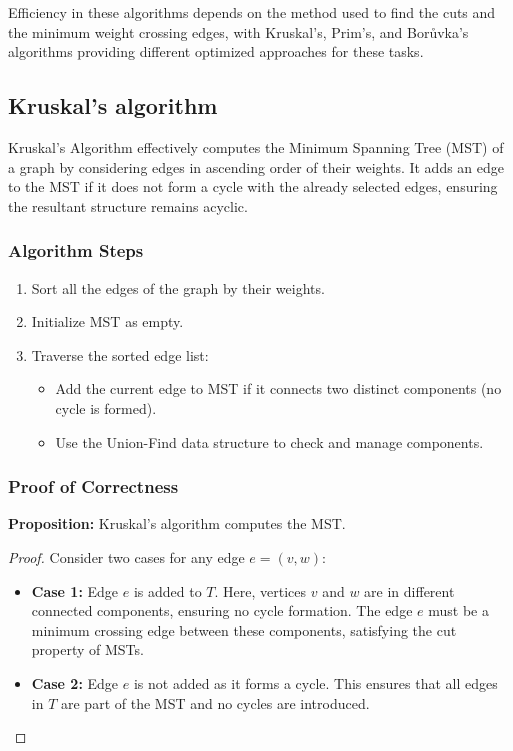 \documentclass{article}
\begin{document}
Efficiency in these algorithms depends on the method used to find the cuts and the minimum weight crossing edges, with Kruskal’s, Prim's, and Borůvka’s algorithms providing different optimized approaches for these tasks.

\subsection{Kruskal's algorithm}

Kruskal's Algorithm effectively computes the Minimum Spanning Tree (MST) of a graph by considering edges in ascending order of their weights. It adds an edge to the MST if it does not form a cycle with the already selected edges, ensuring the resultant structure remains acyclic.

\subsubsection{Algorithm Steps}
\begin{enumerate}
  \item Sort all the edges of the graph by their weights.
  \item Initialize MST as empty.
  \item Traverse the sorted edge list:
    \begin{itemize}
      \item Add the current edge to MST if it connects two distinct components (no cycle is formed).
      \item Use the Union-Find data structure to check and manage components.
    \end{itemize}
\end{enumerate}

\subsubsection{Proof of Correctness}
\textbf{Proposition:} Kruskal's algorithm computes the MST.
\begin{proof}
Consider two cases for any edge $e = (v, w)$:
\begin{itemize}
  \item \textbf{Case 1:} Edge $e$ is added to $T$. Here, vertices $v$ and $w$ are in different connected components, ensuring no cycle formation. The edge $e$ must be a minimum crossing edge between these components, satisfying the cut property of MSTs.
  \item \textbf{Case 2:} Edge $e$ is not added as it forms a cycle. This ensures that all edges in $T$ are part of the MST and no cycles are introduced.
\end{itemize}
\end{proof}
\end{document}
